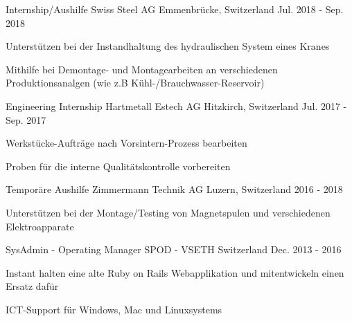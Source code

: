 

\begin{cventries}

\cventry
{Internship/Aushilfe} %
{Swiss Steel AG} %
{Emmenbrücke, Switzerland} %
{Jul. 2018 - Sep. 2018} %
{
	\begin{cvitems} %
		\item {Unterstützen bei der Instandhaltung des hydraulischen System eines Kranes}
		\item {Mithilfe bei Demontage- und Montagearbeiten an verschiedenen Produktionsanalgen (wie z.B Kühl-/Brauchwasser-Reservoir)}
	\end{cvitems}
}	
\cventry
{Engineering Internship} %
{Hartmetall Estech AG} %
{Hitzkirch, Switzerland} %
{Jul. 2017 - Sep. 2017} %
{
	\begin{cvitems} %
		\item {Werkstücke-Aufträge nach Vorsintern-Prozess bearbeiten}
		\item {Proben für die interne Qualitätskontrolle vorbereiten}
	\end{cvitems}
}
\cventry
{Temporäre Aushilfe} %
{Zimmermann Technik AG} %
{Luzern, Switzerland} %
{2016 - 2018} %
{
	\begin{cvitems} %
		\item {Unterstützen bei der Montage/Testing von Magnetspulen und verschiedenen Elektroapparate}
	\end{cvitems}
}	
  \cventry
    {SysAdmin - Operating Manager} %
    {SPOD - VSETH} %
    {Switzerland} %
    {Dec. 2013 - 2016} %
    {
      \begin{cvitems} %
        \item {Instant halten eine alte Ruby on Rails Webapplikation und mitentwickeln einen Ersatz dafür}
        \item {ICT-Support für Windows, Mac und Linuxsystems}
      \end{cvitems}
    }


\end{cventries}
